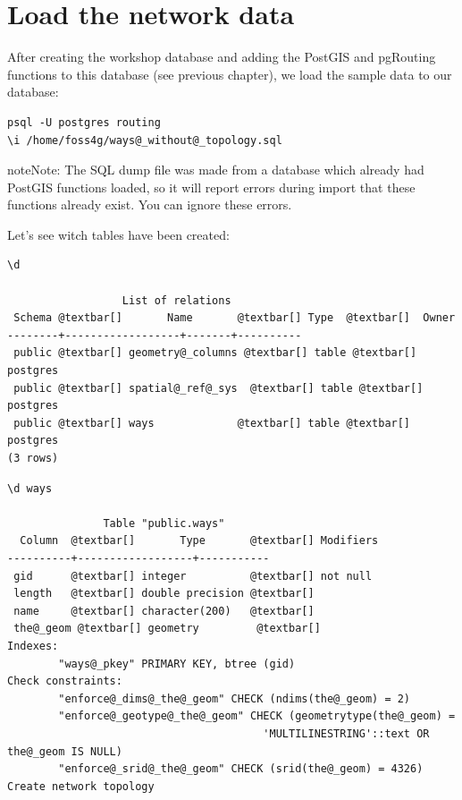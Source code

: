 \documentclass[a4paper,10pt,english]{manual}
\begin{document}
\section{Load the network data}

After creating the workshop database and adding the PostGIS and pgRouting functions to this database (see previous chapter), we load the sample data to our database:

\begin{Verbatim}[commandchars=@\[\]]
psql -U postgres routing
\i /home/foss4g/ways@_without@_topology.sql
\end{Verbatim}

\begin{notice}{note}{Note:}
The SQL dump file was made from a database which already had PostGIS functions loaded, so it will report errors during import that these functions already exist. You can ignore these errors.
\end{notice}

Let's see witch tables have been created:

\begin{Verbatim}[commandchars=@\[\]]
\d

                  List of relations
 Schema @textbar[]       Name       @textbar[] Type  @textbar[]  Owner
--------+------------------+-------+----------
 public @textbar[] geometry@_columns @textbar[] table @textbar[] postgres
 public @textbar[] spatial@_ref@_sys  @textbar[] table @textbar[] postgres
 public @textbar[] ways             @textbar[] table @textbar[] postgres
(3 rows)
\end{Verbatim}

\begin{Verbatim}[commandchars=@\[\]]
\d ways

               Table "public.ways"
  Column  @textbar[]       Type       @textbar[] Modifiers
----------+------------------+-----------
 gid      @textbar[] integer          @textbar[] not null
 length   @textbar[] double precision @textbar[]
 name     @textbar[] character(200)   @textbar[]
 the@_geom @textbar[] geometry         @textbar[]
Indexes:
        "ways@_pkey" PRIMARY KEY, btree (gid)
Check constraints:
        "enforce@_dims@_the@_geom" CHECK (ndims(the@_geom) = 2)
        "enforce@_geotype@_the@_geom" CHECK (geometrytype(the@_geom) =
                                        'MULTILINESTRING'::text OR the@_geom IS NULL)
        "enforce@_srid@_the@_geom" CHECK (srid(the@_geom) = 4326)
Create network topology
\end{Verbatim}
\end{document}
